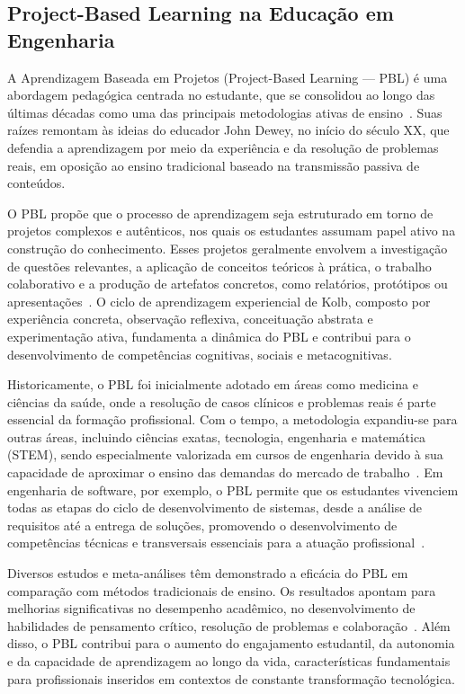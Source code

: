 \documentclass[english, spanish, brazilian]{modelo_dt}
\begin{document}
\subsection{Project-Based Learning na Educação em Engenharia}

A Aprendizagem Baseada em Projetos (Project-Based Learning — PBL) é uma abordagem pedagógica centrada no estudante, que se consolidou ao longo das últimas décadas como uma das principais metodologias ativas de ensino~\parencite{khuankrue2017agent, savery2015overview}. Suas raízes remontam às ideias do educador John Dewey, no início do século XX, que defendia a aprendizagem por meio da experiência e da resolução de problemas reais, em oposição ao ensino tradicional baseado na transmissão passiva de conteúdos.

O PBL propõe que o processo de aprendizagem seja estruturado em torno de projetos complexos e autênticos, nos quais os estudantes assumam papel ativo na construção do conhecimento. Esses projetos geralmente envolvem a investigação de questões relevantes, a aplicação de conceitos teóricos à prática, o trabalho colaborativo e a produção de artefatos concretos, como relatórios, protótipos ou apresentações~\parencite{khuankrue2017agent, kolb1984experiential}. O ciclo de aprendizagem experiencial de Kolb, composto por experiência concreta, observação reflexiva, conceituação abstrata e experimentação ativa, fundamenta a dinâmica do PBL e contribui para o desenvolvimento de competências cognitivas, sociais e metacognitivas.

Historicamente, o PBL foi inicialmente adotado em áreas como medicina e ciências da saúde, onde a resolução de casos clínicos e problemas reais é parte essencial da formação profissional. Com o tempo, a metodologia expandiu-se para outras áreas, incluindo ciências exatas, tecnologia, engenharia e matemática (STEM), sendo especialmente valorizada em cursos de engenharia devido à sua capacidade de aproximar o ensino das demandas do mercado de trabalho~\parencite{zhang2023effectiveness, guo2020systematic}. Em engenharia de software, por exemplo, o PBL permite que os estudantes vivenciem todas as etapas do ciclo de desenvolvimento de sistemas, desde a análise de requisitos até a entrega de soluções, promovendo o desenvolvimento de competências técnicas e transversais essenciais para a atuação profissional~\parencite{valente2025ensino}.

Diversos estudos e meta-análises têm demonstrado a eficácia do PBL em comparação com métodos tradicionais de ensino. Os resultados apontam para melhorias significativas no desempenho acadêmico, no desenvolvimento de habilidades de pensamento crítico, resolução de problemas e colaboração~\parencite{zhang2023effectiveness, balemen2018effectiveness}. Além disso, o PBL contribui para o aumento do engajamento estudantil, da autonomia e da capacidade de aprendizagem ao longo da vida, características fundamentais para profissionais inseridos em contextos de constante transformação tecnológica.
\end{document}
